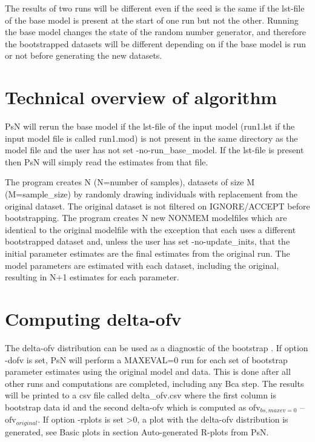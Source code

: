 The results of two runs will be different even if the seed is the same if the lst-file of the base model is present at the start of one run but not the other. Running the base model changes the state of the random number generator, and therefore the bootstrapped datasets will be different depending on if the base model is run or not before generating the  new datasets. 

\section{Technical overview of algorithm}

PsN will rerun the base model if the lst-file of the input model (run1.lst if the input model file is called run1.mod) is not present in the same directory as the model file 
and the user has not set -no-run\_base\_model. If the lst-file is present then PsN will simply read the estimates from that file.

The program creates N (N=number of samples), datasets of size M (M=sample\_size) by randomly drawing individuals with replacement from the original dataset.
The original dataset is not filtered on IGNORE/ACCEPT before bootstrapping.
The program creates N new NONMEM modelfiles which are identical to the original modelfile with the exception that each uses a different  bootstrapped dataset and, 
unless the user has set -no-update\_inits,
that the initial parameter estimates are the final estimates from the original run. 
The model parameters are estimated with each dataset, including the original, resulting in N+1 estimates for each parameter.

\section{Computing delta-ofv}

The delta-ofv distribution can be used as a 
diagnostic of the bootstrap \cite{Niebecker}.
If option -dofv is set, PsN will perform a MAXEVAL=0 run for each set of bootstrap parameter estimates using the original model and data. This is done after all other runs and computations are completed, including any Bca step. The results will be printed to a csv file called delta\_ofv.csv where the first column is bootstrap data id and the second delta-ofv which is computed as 
$\mathrm{ofv}_{bs,maxev=0}$ – $\mathrm{ofv}_{original}$. 
If option -rplots is set >0, a plot with the delta-ofv distribution is
generated, see Basic plots in section Auto-generated R-plots from PsN. 

